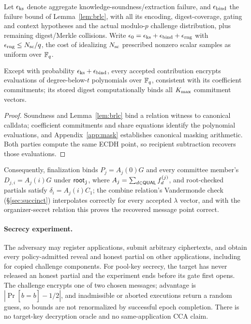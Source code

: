 Let $\epsilon_{\rm ks}$ denote aggregate knowledge-soundness/extraction failure, and $\epsilon_{\rm bind}$ the failure bound of Lemma~\ref{lem:brlc}, with all its encoding, digest-coverage, gating and context hypotheses and the actual modulo-$p$ challenge distribution, plus remaining digest/Merkle collisions. Write $\epsilon_0=\epsilon_{\rm ks}+\epsilon_{\rm bind}+\epsilon_{\rm rng}$ with $\epsilon_{\rm rng}\le N_{\rm sc}/q$, the cost of idealizing $N_{\rm sc}$ prescribed nonzero scalar samples as uniform over $\mathbb{F}_q$.

\begin{lemma}
\label{lem:dealing}
Except with probability $\epsilon_{\rm ks}+\epsilon_{\rm bind}$, every accepted contribution encrypts evaluations of degree-below-$t$ polynomials over $\mathbb{F}_q$, consistent with its coefficient commitments; its stored digest computationally binds all $K_{\max}$ commitment vectors.
\end{lemma}
\begin{proof}
Soundness and Lemma~\ref{lem:brlc} bind a relation witness to canonical calldata; coefficient commitments and share equations identify the polynomial evaluations, and Appendix~\ref{app:mask} establishes canonical masking arithmetic. Both parties compute the same ECDH point, so recipient subtraction recovers those evaluations.
\end{proof}

Consequently, finalization binds $P_j=A_j(0)G$ and every committee member's $D_{j,i}=A_j(i)G$ under $\mathsf{root}_{\mathtt{j}}$, where $A_j=\sum_{d\in\mathsf{QUAL}}f_d^{(j)}$, and root-checked partials satisfy $\delta_i=A_j(i)C_1$; the combine relation's Vandermonde check (\S\ref{sec:succinct}) interpolates correctly for every accepted $\lambda$ vector, and with the organizer-secret relation this proves the recovered message point correct.

\paragraph{Secrecy experiment.}
The adversary may register applications, submit arbitrary ciphertexts, and obtain every policy-admitted reveal and honest partial on other applications, including for copied challenge components. For pool-key secrecy, the target has never released an honest partial and the experiment ends before its gate first opens. The challenge encrypts one of two chosen messages; advantage is $|\Pr[\hat b=b]-1/2|$, and inadmissible or aborted executions return a random guess, so bounds are not renormalized by successful epoch completion. There is no target-key decryption oracle and no same-application CCA claim.

